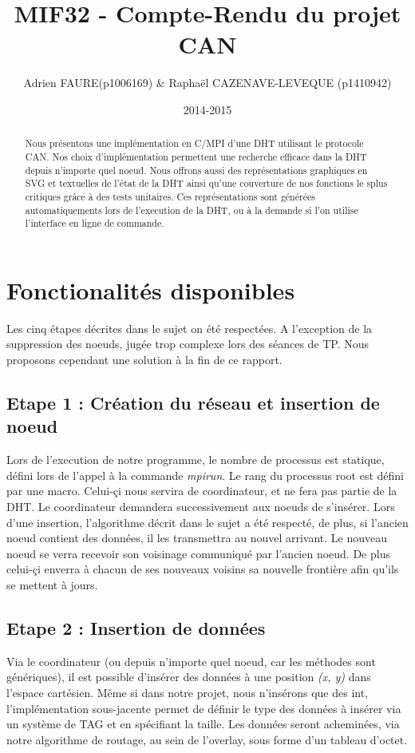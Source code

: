 \documentclass[a4paper, 11pt, french]{article}
\title{\textbf{MIF32 - Compte-Rendu du projet CAN}}
\author{Adrien FAURE(p1006169) \& Raphaël CAZENAVE-LEVEQUE (p1410942)}
\date{2014-2015}
\begin{document}
    \maketitle

\begin{abstract}
Nous présentons une implémentation en C/MPI d'une DHT utilisant le protocole CAN. Nos choix d'implémentation permettent une recherche efficace dans la DHT depuis n'importe quel noeud. Nous offrons aussi des représentations graphiques en SVG et textuelles de l'état de la DHT ainsi qu'une couverture de nos fonctions le splus critiques grâce à des tests unitaires. Ces représentations sont générées automatiquements lors de l'execution de la DHT, ou à la demande si l'on utilise l'interface en ligne de commande.
\end{abstract}
\section{Fonctionalités disponibles}
Les cinq étapes décrites dans le sujet on été respectées. A l'exception de la suppression des noeuds, jugée trop complexe lors des séances de TP. Nous proposons cependant une solution à la fin de ce rapport.
\subsection{Etape 1 : Création du réseau et insertion de noeud}
Lors de l'execution de notre programme, le nombre de processus est statique, défini lors de l'appel à la commande \textit{mpirun}. Le rang du processus root est défini par une macro. Celui-çi nous servira de coordinateur, et ne fera pas partie de la DHT. Le coordinateur demandera successivement aux noeuds de s'insérer. Lors d'une insertion, l'algorithme décrit dans le sujet a été respecté, de plus, si l'ancien noeud contient des données, il les transmettra au nouvel arrivant. Le nouveau noeud se verra recevoir son voisinage communiqué par l'ancien noeud. De plus celui-çi enverra à chacun de ses nouveaux voisins sa nouvelle frontière afin qu'ils se mettent à jours.
\subsection{Etape 2 : Insertion de données}
Via le coordinateur (ou depuis n'importe quel noeud, car les méthodes sont génériques), il est possible d'insérer des données à une position \textit{(x, y)} dans l'espace cartésien. Même si dans notre projet, nous n'insérons que des int, l'implémentation sous-jacente permet de définir le type des données à insérer via un système de TAG et en spécifiant la taille. Les données seront acheminées, via notre algorithme de routage, au sein de l'overlay, sous forme d'un tableau d'octet.
\end{document}

